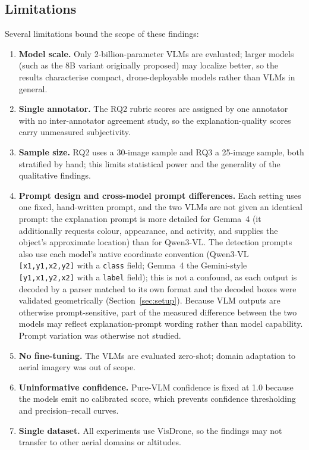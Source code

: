 \documentclass[acmtog, authorversion]{acmart}
\begin{document}
\subsection{Limitations}
Several limitations bound the scope of these findings:
\begin{enumerate}
  \item \textbf{Model scale.} Only 2-billion-parameter VLMs are
    evaluated; larger models (such as the 8B variant originally
    proposed) may localize better, so the results characterise
    compact, drone-deployable models rather than VLMs in general.
  \item \textbf{Single annotator.} The RQ2 rubric scores are assigned
    by one annotator with no inter-annotator agreement study, so the
    explanation-quality scores carry unmeasured subjectivity.
  \item \textbf{Sample size.} RQ2 uses a 30-image sample and RQ3 a
    25-image sample, both stratified by hand; this limits statistical
    power and the generality of the qualitative findings.
  \item \textbf{Prompt design and cross-model prompt differences.}
    Each setting uses one fixed, hand-written prompt, and the two VLMs
    are not given an identical prompt: the explanation prompt is more
    detailed for Gemma~4 (it additionally requests colour, appearance,
    and activity, and supplies the object's approximate location) than
    for Qwen3-VL. The detection prompts also use each model's native
    coordinate convention (Qwen3-VL \texttt{[x1,y1,x2,y2]} with a
    \texttt{class} field; Gemma~4 the Gemini-style \texttt{[y1,x1,y2,x2]}
    with a \texttt{label} field); this is not a confound, as each output
    is decoded by a parser matched to its own format and the decoded
    boxes were validated geometrically (Section~\ref{sec:setup}). Because
    VLM outputs are otherwise prompt-sensitive, part of the measured
    difference between the two models may reflect explanation-prompt
    wording rather than model capability. Prompt variation was otherwise
    not studied.
  \item \textbf{No fine-tuning.} The VLMs are evaluated zero-shot;
    domain adaptation to aerial imagery was out of scope.
  \item \textbf{Uninformative confidence.} Pure-VLM confidence is
    fixed at 1.0 because the models emit no calibrated score, which
    prevents confidence thresholding and precision--recall curves.
  \item \textbf{Single dataset.} All experiments use VisDrone, so the
    findings may not transfer to other aerial domains or altitudes.
\end{enumerate}
\end{document}
